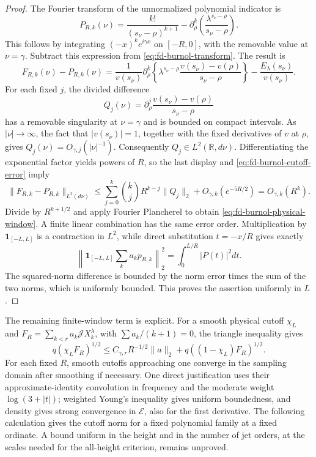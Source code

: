 \begin{proof}
The Fourier transform of the unnormalized polynomial indicator is
\[
 P_{R,k}(\nu)=\frac{k!}{(s_\nu-\rho)^{k+1}}
        -\partial_\rho^k\left(
                 \frac{\lambda^{s_\nu-\rho}}{s_\nu-\rho}\right).
\]
This follows by integrating \((-x)^k e^{i\gamma x}\) on
\([-R,0]\), with the removable value at \(\nu=\gamma\).
Subtract this expression from \eqref{eq:fd-burnol-transform}.
The result is
\[
 F_{R,k}(\nu)-P_{R,k}(\nu)
 =\frac1{v(s_\nu)}\partial_\rho^k
       \left\{\lambda^{s_\nu-\rho}
          \frac{v(s_\nu)-v(\rho)}{s_\nu-\rho}\right\}
       -\frac{E_\lambda(s_\nu)}{v(s_\nu)}.
\]
For each fixed \(j\), the divided difference
\[
 Q_j(\nu)=\partial_\rho^j
                 \frac{v(s_\nu)-v(\rho)}{s_\nu-\rho}
\]
has a removable singularity at \(\nu=\gamma\) and is bounded
on compact intervals. As \(|\nu|\to\infty\), the fact that
\(|v(s_\nu)|=1\), together with the fixed derivatives of
\(v\) at \(\rho\), gives \(Q_j(\nu)=O_{\gamma,j}(|\nu|^{-1})\).
Consequently \(Q_j\in L^2(\mathbb R,d\nu)\).
Differentiating the exponential factor yields powers of \(R\),
so the last display and \eqref{eq:fd-burnol-cutoff-error} imply
\[
 \|F_{R,k}-P_{R,k}\|_{L^2(d\nu)}
      \le \sum_{j=0}^k\binom kj R^{k-j}\|Q_j\|_2
                       +O_{\gamma,k}(e^{-5R/2})
      =O_{\gamma,k}(R^k).
\]
Divide by \(R^{k+1/2}\) and apply Fourier Plancherel to obtain
\eqref{eq:fd-burnol-physical-window}. A finite linear combination
has the same error order. Multiplication by
\(\mathbf1_{[-L,L]}\) is a contraction in \(L^2\), while direct
substitution \(t=-x/R\) gives exactly
\[
 \left\|\mathbf1_{[-L,L]}\sum_k a_kp_{R,k}\right\|_2^2
                      =\int_0^{L/R}|P(t)|^2dt.
\]
The squared-norm difference is bounded by the norm error times
the sum of the two norms, which is uniformly bounded. This proves
the assertion uniformly in \(L\).
\end{proof}

The remaining finite-window term is explicit. For a smooth physical
cutoff \(\chi_L\) and
\(F_R=\sum_{k<r}a_k\mathcal JX_k^\lambda\), with
\(\sum a_k/(k+1)=0\), the triangle inequality gives
\[
 q(\chi_LF_R)^{1/2}
 \le C_{\gamma,r}R^{-1/2}\|a\|_2
             +q((1-\chi_L)F_R)^{1/2}.
\]
For each fixed \(R\), smooth cutoffs approaching one converge in
the sampling domain after smoothing if necessary. One direct
justification uses their approximate-identity convolution in
frequency and the moderate weight \(\log(3+|t|)\); weighted
Young's inequality gives uniform boundedness, and density gives
strong convergence in \(\mathcal E\), also for the first
derivative. The following calculation gives the cutoff norm for a fixed
polynomial family at a fixed ordinate. A bound uniform in the
height and in the number of jet orders, at the scales needed for
the all-height criterion, remains unproved.


